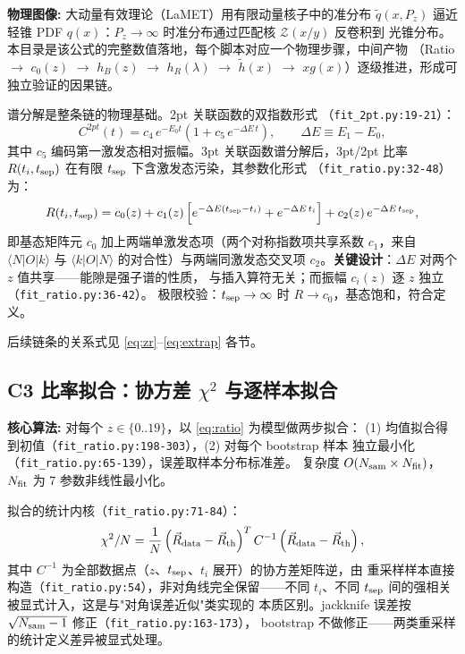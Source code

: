 \documentclass[UTF8]{ctexart}
\begin{document}
\begin{physbox}
\textbf{物理图像:} 大动量有效理论（LaMET）用有限动量核子中的准分布 $\tilde{q}(x,P_z)$
逼近轻锥 PDF $q(x)$：$P_z\to\infty$ 时准分布通过匹配核 $\mathcal{Z}(x/y)$ 反卷积到
光锥分布。本目录是该公式的完整数值落地，每个脚本对应一个物理步骤，中间产物
（Ratio $\to$ $c_0(z)$ $\to$ $h_B(z)$ $\to$ $h_R(\lambda)$ $\to$ $\tilde{h}(x)$
$\to$ $xg(x)$）逐级推进，形成可独立验证的因果链。
\end{physbox}

谱分解是整条链的物理基础。2pt 关联函数的双指数形式
（\texttt{fit\_2pt.py:19-21}）：
\begin{equation}\label{eq:2pt}
C^{2pt}(t) = c_4\, e^{-E_0 t}\left(1 + c_5\, e^{-\Delta E\, t}\right),\qquad
\Delta E \equiv E_1 - E_0,
\end{equation}
其中 $c_5$ 编码第一激发态相对振幅。3pt 关联函数谱分解后，3pt/2pt 比率
$R(t_i, t_{\rm sep})$ 在有限 $t_{\rm sep}$ 下含激发态污染，其参数化形式
（\texttt{fit\_ratio.py:32-48}）为：
\begin{equation}\label{eq:ratio}
R(t_i,t_{\rm sep}) = c_0(z) + c_1(z)\left[e^{-\Delta E(t_{\rm sep}-t_i)} + e^{-\Delta E\, t_i}\right] + c_2(z)\, e^{-\Delta E\, t_{\rm sep}},
\end{equation}
即基态矩阵元 $c_0$ 加上两端单激发态项（两个对称指数项共享系数 $c_1$，来自
$\langle N|O|k\rangle$ 与 $\langle k|O|N\rangle$ 的对合性）与两端同激发态交叉项
$c_2$。\textbf{关键设计}：$\Delta E$ 对两个 $z$ 值共享——能隙是强子谱的性质，
与插入算符无关；而振幅 $c_i(z)$ 逐 $z$ 独立（\texttt{fit\_ratio.py:36-42}）。
极限校验：$t_{\rm sep}\to\infty$ 时 $R\to c_0$，基态饱和，符合定义。

后续链条的关系式见 \eqref{eq:zr}--\eqref{eq:extrap} 各节。

\subsection{C3 比率拟合：协方差 $\chi^2$ 与逐样本拟合}

\begin{algobox}
\textbf{核心算法:} 对每个 $z\in\{0..19\}$，以 \eqref{eq:ratio} 为模型做两步拟合：
(1) 均值拟合得到初值（\texttt{fit\_ratio.py:198-303}），(2) 对每个 bootstrap 样本
独立最小化（\texttt{fit\_ratio.py:65-139}），误差取样本分布标准差。
复杂度 $O(N_{\rm sam}\times N_{\rm fit})$，$N_{\rm fit}$ 为 7 参数非线性最小化。
\end{algobox}

拟合的统计内核（\texttt{fit\_ratio.py:71-84}）：
\begin{equation}\label{eq:chi2}
\chi^2/N = \frac{1}{N}\left(\vec R_{\rm data} - \vec R_{\rm th}\right)^T C^{-1}\left(\vec R_{\rm data} - \vec R_{\rm th}\right),
\end{equation}
其中 $C^{-1}$ 为全部数据点（$z$、$t_{\rm sep}$、$t_i$ 展开）的协方差矩阵逆，由
重采样样本直接构造（\texttt{fit\_ratio.py:54}），非对角线完全保留——不同
$t_i$、不同 $t_{\rm sep}$ 间的强相关被显式计入，这是与"对角误差近似"类实现的
本质区别。jackknife 误差按 $\sqrt{N_{\rm sam}-1}$ 修正（\texttt{fit\_ratio.py:163-173}），
bootstrap 不做修正——两类重采样的统计定义差异被显式处理。
\end{document}
